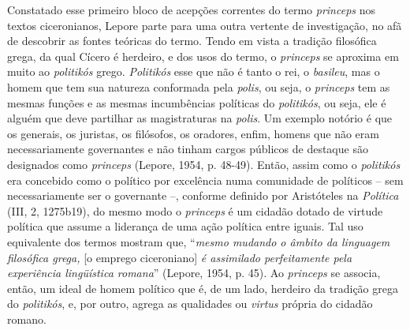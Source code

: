 Constatado esse primeiro bloco de acepções correntes do termo
\emph{princeps} nos textos ciceronianos, Lepore parte para uma outra
vertente de investigação, no afã de descobrir as fontes teóricas do
termo. Tendo em vista a tradição filosófica grega, da qual Cícero é
herdeiro, e dos usos do termo, o \emph{princeps} se aproxima em muito ao
\emph{politikós} grego. \emph{Politikós} esse que não é tanto o rei, o
\emph{basileu}, mas o homem que tem sua natureza conformada pela
\emph{polis}, ou seja, o \emph{princeps} tem as mesmas funções e as
mesmas incumbências políticas do \emph{politikós}, ou seja, ele é alguém
que deve partilhar as magistraturas na \emph{polis}. Um exemplo notório
é que os generais, os juristas, os filósofos, os oradores, enfim, homens
que não eram necessariamente governantes e não tinham cargos públicos de
destaque são designados como \emph{princeps} (Lepore, 1954, p. 48-49).
Então, assim como o \emph{politikós} era concebido como o político por
excelência numa comunidade de políticos -- sem necessariamente ser o
governante --, conforme definido por Aristóteles na \emph{Política}
(III, 2, 1275b19), do mesmo modo o \emph{princeps} é um cidadão dotado
de virtude política que assume a liderança de uma ação política entre
iguais. Tal uso equivalente dos termos mostram que, ``\emph{mesmo
mudando o âmbito da linguagem filosófica grega,} {[}o emprego
ciceroniano{]} \emph{é assimilado perfeitamente pela experiência
lingüística romana}'' (Lepore, 1954, p. 45). Ao \emph{princeps} se
associa, então, um ideal de homem político que é, de um lado, herdeiro
da tradição grega do \emph{politikós}, e, por outro, agrega as
qualidades ou \emph{virtus} própria do cidadão romano.

